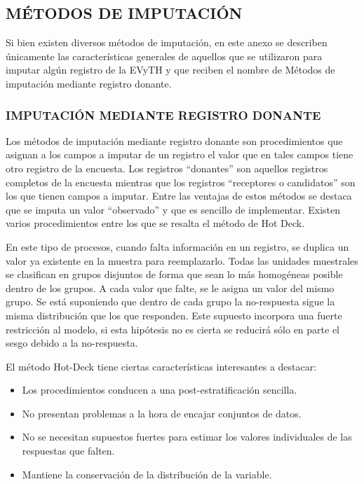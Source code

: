 \documentclass[
  openany]{book}
\begin{document}
\hypertarget{metodos-de-imputacion}{%
\subsection{\texorpdfstring{\textbf{MÉTODOS DE IMPUTACIÓN}}{MÉTODOS DE IMPUTACIÓN}}\label{metodos-de-imputacion}}

Si bien existen diversos métodos de imputación, en este anexo se describen únicamente las características generales de aquellos que se utilizaron para imputar algún registro de la EVyTH y que reciben el nombre de Métodos de imputación mediante registro donante.

\hypertarget{imputaciuxf3n-mediante-registro-donante}{%
\subsubsection{\texorpdfstring{\textbf{IMPUTACIÓN MEDIANTE REGISTRO DONANTE}}{IMPUTACIÓN MEDIANTE REGISTRO DONANTE}}\label{imputaciuxf3n-mediante-registro-donante}}

Los métodos de imputación mediante registro donante son procedimientos que asignan a los campos a imputar de un registro el valor que en tales campos tiene otro registro de la encuesta. Los registros ``donantes'' son aquellos registros completos de la encuesta mientras que los registros ``receptores o candidatos'' son los que tienen campos a imputar. Entre las ventajas de estos métodos se destaca que se imputa un valor ``observado'' y que es sencillo de implementar. Existen varios procedimientos entre los que se resalta el método de Hot Deck.

En este tipo de procesos, cuando falta información en un registro, se duplica un valor ya existente en la muestra para reemplazarlo. Todas las unidades muestrales se clasifican en grupos disjuntos de forma que sean lo más homogéneas posible dentro de los grupos. A cada valor que falte, se le asigna un valor del mismo grupo. Se está suponiendo que dentro de cada grupo la no-respuesta sigue la misma distribución que los que responden. Este supuesto incorpora una fuerte restricción al modelo, si esta hipótesis no es cierta se reducirá sólo en parte el sesgo debido a la no-respuesta.

El método Hot-Deck tiene ciertas características interesantes a destacar:

\begin{itemize}
\item
  Los procedimientos conducen a una post-estratificación sencilla.
\item
  No presentan problemas a la hora de encajar conjuntos de datos.
\item
  No se necesitan supuestos fuertes para estimar los valores individuales de las respuestas que falten.
\item
  Mantiene la conservación de la distribución de la variable.
\end{itemize}
\end{document}

